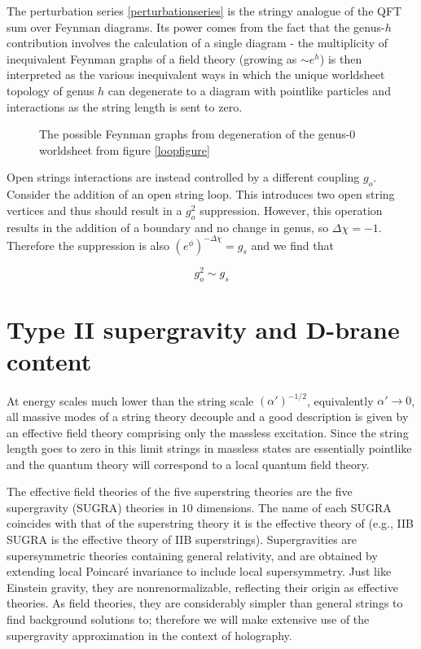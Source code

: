 The perturbation series \eqref{perturbationseries} is the stringy analogue of the QFT sum over Feynman diagrams. Its power comes from the fact that the genus-$h$ contribution involves the calculation of a single diagram - the multiplicity of inequivalent Feynman graphs of a field theory (growing as $\sim e^h$) is then interpreted as the various inequivalent ways in which the unique worldsheet topology of genus $h$ can degenerate to a diagram with pointlike particles and interactions as the string length is sent to zero.


\begin{figure}[h!]
\centering
\def\svgwidth{300pt}
\captionsetup{width=0.8\textwidth}

\caption{The possible Feynman graphs from degeneration of the genus-$0$ worldsheet from figure \ref{loopfigure}}
\end{figure}



Open strings interactions are instead controlled by a different coupling $g_o$. Consider the addition of an open string loop. This introduces two open string vertices and thus should result in a $g_o^2$ suppression. However, this operation results in the addition of a boundary and no change in genus, so $\Delta\chi = -1$. Therefore the suppression is also $(e^\phi)^{-\Delta\chi} = g_s$ and we find that

\begin{equation}
	g_o^2 \sim g_s
	\label{}
\end{equation}



\section{Type II supergravity and D-brane content}

At energy scales much lower than the string scale $(\alpha')^{-1/2}$, equivalently $\alpha' \rightarrow 0$, all massive modes of a string theory decouple and a good description is given by an effective field theory comprising only the massless excitation. Since the string length goes to zero in this limit strings in massless states are essentially pointlike and the quantum theory will correspond to a local quantum field theory.

The effective field theories of the five superstring theories are the five supergravity (SUGRA) theories in $10$ dimensions. The name of each SUGRA coincides with that of the superstring theory it is the effective theory of (e.g., IIB SUGRA is the effective theory of IIB superstrings). Supergravities are supersymmetric theories containing general relativity, and are obtained by extending local Poincar\'e invariance to include local supersymmetry. Just like Einstein gravity, they are nonrenormalizable, reflecting their origin as effective theories. As field theories, they are considerably simpler than general strings to find background solutions to; therefore we will make extensive use of the supergravity approximation in the context of holography.


